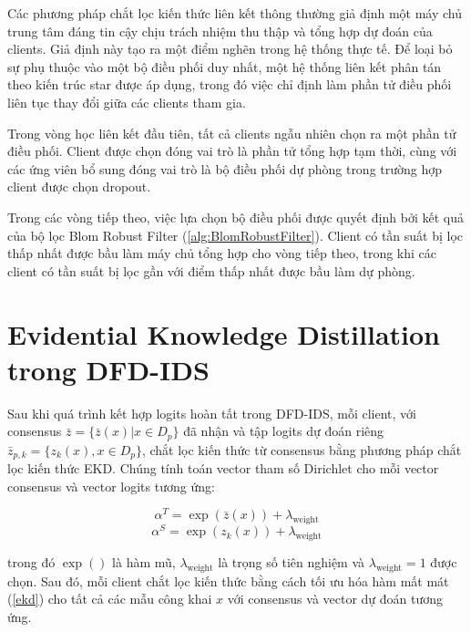 Các phương pháp chắt lọc kiến thức liên kết thông thường giả định một máy chủ trung tâm đáng tin cậy chịu trách nhiệm thu thập và tổng hợp dự đoán của clients. Giả định này tạo ra một điểm nghẽn trong hệ thống thực tế. Để loại bỏ sự phụ thuộc vào một bộ điều phối duy nhất, một hệ thống liên kết phân tán theo kiến trúc star được áp dụng, trong đó việc chỉ định làm phần tử điều phối liên tục thay đổi giữa các clients tham gia.

Trong vòng học liên kết đầu tiên, tất cả clients ngẫu nhiên chọn ra một phần tử điều phối. Client được chọn đóng vai trò là phần tử tổng hợp tạm thời, cùng với các ứng viên bổ sung đóng vai trò là bộ điều phối dự phòng trong trường hợp client được chọn dropout.

Trong các vòng tiếp theo, việc lựa chọn bộ điều phối được quyết định bởi kết quả của bộ lọc Blom Robust Filter (\ref{alg:BlomRobustFilter}). Client có tần suất bị lọc thấp nhất được bầu làm máy chủ tổng hợp cho vòng tiếp theo, trong khi các client có tần suất bị lọc gần với điểm thấp nhất được bầu làm dự phòng.

\section{Evidential Knowledge Distillation trong DFD-IDS}
\label{sec:ekd_dfdids}

Sau khi quá trình kết hợp logits hoàn tất trong DFD-IDS, mỗi client, với consensus $\bar{z} = \{\bar{z}(x)|x \in D_p\}$ đã nhận và tập logits dự đoán riêng $\bar z_{p,k} = \{z_k(x), x \in D_p\}$, chắt lọc kiến thức từ consensus bằng phương pháp chắt lọc kiến thức EKD. Chúng tính toán vector tham số Dirichlet cho mỗi vector consensus và vector logits tương ứng:

$$\alpha^T = \exp(\bar z(x)) + \lambda_{\text{weight}}$$
$$\alpha^S = \exp(z_k(x)) + \lambda_{\text{weight}}$$

trong đó $\exp()$ là hàm mũ, $\lambda_{\text{weight}}$ là trọng số tiên nghiệm và $\lambda_{\text{weight}}=1$ được chọn. Sau đó, mỗi client chắt lọc kiến thức bằng cách tối ưu hóa hàm mất mát (\ref{ekd}) cho tất cả các mẫu công khai $x$ với consensus và vector dự đoán tương ứng.

